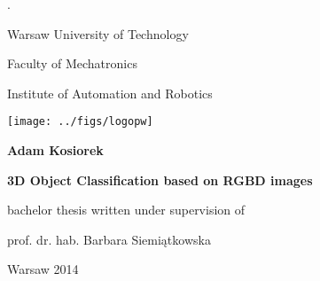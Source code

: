 \pagestyle{empty}
\color{white} . \color{black}
\vspace{0.2cm}

\begin{center}
\begin{Huge}Warsaw University of Technology
\end{Huge}
\end{center}

\begin{center}
\begin{LARGE}Faculty of Mechatronics

\vspace{0.5cm}
Institute of Automation and Robotics
\vspace{1.0cm}
\end{LARGE}
\end{center}
\begin{center}\texttt{[image: ../figs/logopw]}\end{center} 

\vspace{0.5cm}

\begin{center}
\begin{LARGE}\textbf{Adam Kosiorek}\end{LARGE}
\end{center}

\vspace{0.5cm}

\begin{center}
\begin{Huge}\textbf{3D Object Classification based on RGBD images}
\vspace{0.5cm}
\end{Huge}
\end{center}

\vspace{0.5cm}

\begin{center}
\begin{Large}bachelor thesis written under supervision of\end{Large}

\vspace{0.2cm}

\begin{Large}prof. dr. hab. Barbara Siemiątkowska\end{Large}
\end{center}

\vspace{1.8cm}

\begin{center}
\begin{Large}Warsaw 2014\end{Large}
\end{center}

